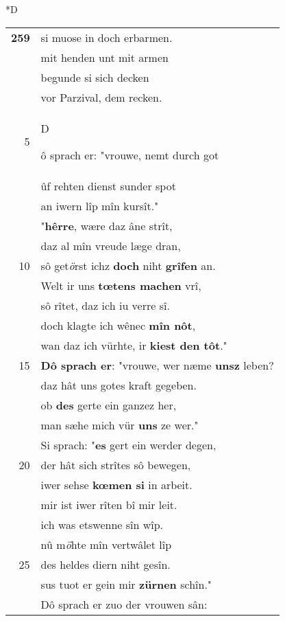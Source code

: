 \documentclass[8pt,a4paper,notitlepage]{article}
\begin{document}
\begin{table}[ht]
\begin{minipage}[t]{0.5\linewidth}
\small
\begin{center}*D
\end{center}
\begin{tabular}{rl}
\textbf{259} & si muose in doch erbarmen.\\ 
 & mit henden unt mit armen\\ 
 & begunde si sich decken\\ 
 & vor Parzival, dem recken.\\ 
5 & \begin{large}D\end{large}ô sprach er: "vrouwe, nemt durch got\\ 
 & ûf rehten dienst sunder spot\\ 
 & an iwern lîp mîn kursît."\\ 
 & "\textbf{hêrre}, wære daz âne strît,\\ 
 & daz al mîn vreude læge dran,\\ 
10 & sô get\textit{ö}rst ichz \textbf{doch} niht \textbf{grîfen} an.\\ 
 & Welt ir uns \textbf{tœtens machen} vrî,\\ 
 & sô rîtet, daz ich iu verre sî.\\ 
 & doch klagte ich wênec \textbf{mîn nôt},\\ 
 & wan daz ich vürhte, ir \textbf{kiest den tôt}."\\ 
15 & \textbf{Dô sprach er}: "vrouwe, wer næme \textbf{uns}\textbf{z} leben?\\ 
 & daz hât uns gotes kraft gegeben.\\ 
 & ob \textbf{des} gerte ein ganzez her,\\ 
 & man sæhe mich vür \textbf{uns} ze wer."\\ 
 & Si sprach: "\textbf{es} gert ein werder degen,\\ 
20 & der hât sich strîtes sô bewegen,\\ 
 & iwer sehse \textbf{kœmen si} in arbeit.\\ 
 & mir ist iwer rîten bî mir leit.\\ 
 & ich was etswenne sîn wîp.\\ 
 & nû m\textit{ö}hte mîn vertwâlet lîp\\ 
25 & des heldes diern niht gesîn.\\ 
 & sus tuot er gein mir \textbf{zürnen} schîn."\\ 
 & Dô sprach er zuo der vrouwen sân:\\ 

\end{tabular}
\end{minipage}
\end{table}
\end{document}
